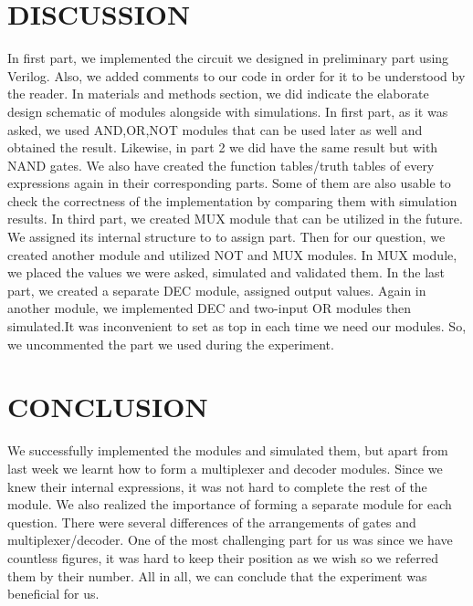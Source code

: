 \documentclass[pdftex,12pt,a4paper]{article}
\begin{document}
\section{DISCUSSION }
In first part, we implemented the circuit we designed in preliminary part using Verilog. Also, we added comments to our code in order for it to be understood by the reader. In materials and methods section, we did indicate the elaborate design schematic of modules alongside with simulations. In first part, as it was asked, we used AND,OR,NOT modules that can be used later as well and obtained the result. Likewise, in part 2 we did have the same result but with NAND gates. We also have created the function tables/truth tables of every expressions again in their corresponding parts. Some of them are also usable to check the correctness of the implementation by comparing them with simulation results. In third part, we created MUX module that can be utilized in the future. We assigned its internal structure to to assign part. Then for our question, we created another module and utilized NOT and MUX modules. In MUX module, we placed the values we were asked, simulated and validated them. In the last part, we created a separate DEC module, assigned output values. Again in another module, we implemented DEC and two-input OR modules then simulated.It was inconvenient to set as top in each time we need our modules. So, we uncommented the part we used during the experiment. 


\section{CONCLUSION}
We successfully implemented the modules and simulated them, but apart from last week we learnt how to form a multiplexer and decoder modules. Since we knew their internal expressions, it was not hard to complete the rest of the module. We also realized the importance of forming a separate module for each question. There were several differences of the arrangements of gates and multiplexer/decoder. One of the most challenging part for us was since we have countless figures, it was hard to keep their position as we wish so we referred them by their number. All in all, we can conclude that the experiment was beneficial for us.  



\nocite{ref1}
\nocite{overleaf}
\end{document}
